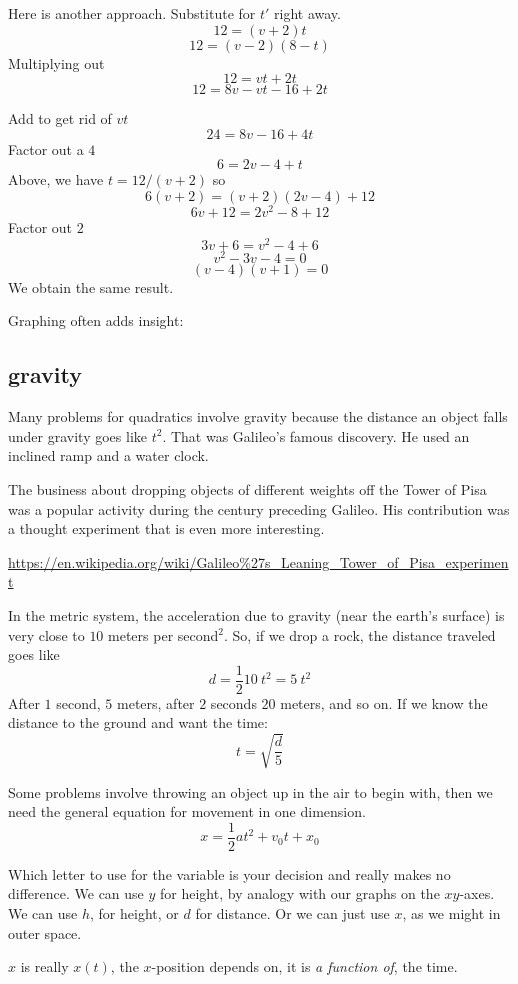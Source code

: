 \documentclass[11pt, oneside]{article}
\begin{document}
Here is another approach.  Substitute for $t'$ right away.
\[ 12 = (v + 2) t \]
\[ 12 = (v - 2) (8 - t) \]
Multiplying out
\[ 12 = vt + 2t \]
\[ 12 = 8v - vt - 16 + 2t \]

Add to get rid of $vt$
\[ 24 = 8v - 16 + 4t \]
Factor out a $4$
\[ 6 = 2v - 4 + t \]
Above, we have $t = 12/(v+2)$ so
\[ 6(v+2) = (v+2)(2v-4) + 12 \]
\[ 6v + 12 = 2v^2 - 8 + 12 \]
Factor out $2$
\[ 3v + 6 = v^2 - 4 + 6 \]
\[ v^2 - 3v - 4 = 0 \]
\[ (v - 4)(v + 1) = 0 \]
We obtain the same result.

Graphing often adds insight:

\subsection*{gravity}
Many problems for quadratics involve gravity because the distance an object falls under gravity goes like $t^2$.  That was Galileo's famous discovery.  He used an inclined ramp and a water clock.  

The business about dropping objects of different weights off the Tower of Pisa was a popular activity during the century preceding Galileo.  His contribution was a thought experiment that is even more interesting.

\url{https://en.wikipedia.org/wiki/Galileo%27s_Leaning_Tower_of_Pisa_experiment}

In the metric system, the acceleration due to gravity (near the earth's surface) is very close to $10$ meters per second$^2$.  So, if we drop a rock, the distance traveled goes like 
\[ d = \frac{1}{2} 10 \ t^2 = 5 \ t^2 \]
After $1$ second, $5$ meters, after $2$ seconds $20$ meters, and so on.  If we know the distance to the ground and want the time:
\[ t = \sqrt{\frac{d}{5}} \]

Some problems involve throwing an object up in the air to begin with, then we need the general equation for movement in one dimension.
\[ x = \frac{1}{2}at^2 + v_0 t + x_0 \]

Which letter to use for the variable is your decision and really makes no difference.  We can use $y$ for height, by analogy with our graphs on the $xy$-axes.  We can use $h$, for height, or $d$ for distance.  Or we can just use $x$, as we might in outer space.

$x$ is really $x(t)$, the $x$-position depends on, it is \emph{a function of}, the time.  
\end{document}
